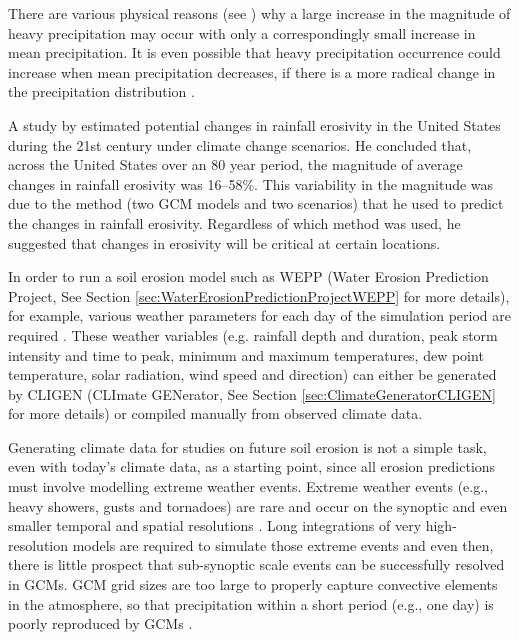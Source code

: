 
There are various physical reasons (see \citealp{trenberth2000-12}) why a large
increase in the magnitude of heavy precipitation may occur with only a
correspondingly small increase in mean precipitation. It is even possible that
heavy precipitation occurrence could increase when mean precipitation decreases,
if there is a more radical change in the precipitation distribution
\citep{osborn2002-1313}.

A study by \citet{nearing2001-229} estimated potential changes in rainfall
erosivity in the United States during the 21st century under climate change
scenarios. He concluded that, across the United States over an 80 year
period, the magnitude of average changes in rainfall erosivity was 16--58\%.
This variability in the magnitude was due to the method (two GCM models and
two scenarios) that he used to predict the changes in rainfall erosivity.
Regardless of which method was used, he suggested that changes in erosivity will
be critical at certain locations.

In order to run a soil erosion model such as WEPP (Water Erosion Prediction
Project, See Section \ref{sec:WaterErosionPredictionProjectWEPP} for more
details), for example, various weather parameters for each day of the
simulation period are required \citep{flanagan1995-usda}. These weather
variables (e.g. rainfall depth and duration, peak storm intensity and time to
peak, minimum and maximum temperatures, dew point temperature, solar radiation,
wind speed and direction) can either be generated by CLIGEN (CLImate GENerator,
See Section \ref{sec:ClimateGeneratorCLIGEN} for more details) or compiled
manually from observed climate data.

Generating climate data for studies on future soil erosion is not a simple task,
even with today's climate data, as a starting point, since all erosion
predictions must involve modelling extreme weather events. Extreme weather
events (e.g., heavy showers, gusts and tornadoes) are rare and occur on the
synoptic and even smaller temporal and spatial resolutions
\citep{schubert1997-223,katz1999-133,coppus2002-1365}. Long integrations of very
high-resolution models are required to simulate those extreme events and even
then, there is little prospect that sub-synoptic scale events can be
successfully resolved in GCMs. GCM grid sizes are too large to properly capture
convective elements in the atmosphere, so that precipitation within a short
period (e.g., one day) is poorly reproduced by GCMs \citep{schubert1997-223}.

